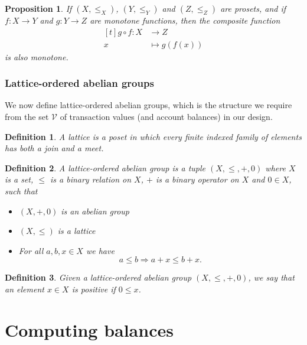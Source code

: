 \documentclass[runningheads]{llncs}
\newtheorem{defn}{Definition}
\newtheorem{prop}{Proposition}
\newcommand{\V}{\mathcal{V}}
\begin{document}
\begin{prop}\label{thm:composition-is-monotone}
	If \((X,\leq_X)\), \((Y,\leq_Y)\) and \((Z,\leq_Z)\) are prosets, and if \(f : X \to Y\) and \(g : Y \to Z\) are monotone functions, then the composite function
	\[
		\begin{aligned}[t]
			g \circ f \colon X & \to Z           \\
			x                  & \mapsto g(f(x))
		\end{aligned}\]
	is also monotone.
\end{prop}

\subsubsection{Lattice-ordered abelian groups}\label{section:lattice-ordered-abelian-groups}

We now define lattice-ordered abelian groups, which is the structure we require from the set \(\V\) of transaction values (and account balances) in our design.

\begin{defn}
	A \emph{lattice} is a poset in which every finite indexed family of elements has both a join and a meet.
\end{defn}

\begin{defn}
	A \emph{lattice-ordered abelian group} is a tuple \((X,\leq, +, 0)\) where \(X\) is a set, \(\leq\) is a binary relation on \(X\), \(+\) is a binary operator on \(X\) and \(0 \in X\), such that
	\begin{itemize}
		\item \((X,+,0)\) is an abelian group
		\item \((X,\leq)\) is a lattice
		\item For all \(a,b,x \in X\) we have \[a \leq b \Rightarrow a + x \leq b + x.\]
	\end{itemize}
\end{defn}

\begin{defn}
	Given a lattice-ordered abelian group \((X,\leq,+,0)\), we say that an element \(x \in X\) is \emph{positive} if \(0 \leq x\).
\end{defn}

\newpage
\section{Computing balances}\label{section:balances}
\end{document}
